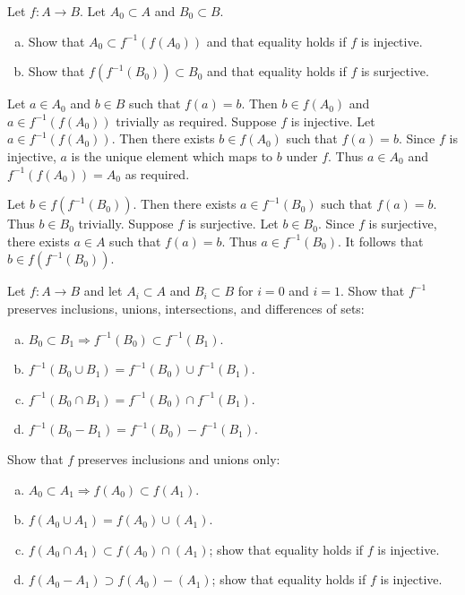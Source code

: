 \documentclass{zupan}
\begin{document}
\begin{problem}{1}
  Let $f : A \to B$. Let $A_0 \subset A$ and $B_0 \subset B$.

  \begin{enumerate}[(a), noitemsep]
    \item Show that $A_0 \subset f^{-1}(f(A_0))$ and that equality holds if $f$ is injective.
    \item Show that $f(f^{-1}(B_0)) \subset B_0$ and that equality holds if $f$ is surjective.
  \end{enumerate}
\end{problem}

\begin{solution}
  Let $a \in A_0$ and $b \in B$ such that $f(a) = b$. Then $b \in f(A_0)$ and
  $a \in f^{-1}(f(A_0))$ trivially as required. Suppose $f$ is injective. Let
  $a \in f^{-1}(f(A_0))$. Then there exists $b \in f(A_0)$ such that $f(a) =
  b$. Since $f$ is injective, $a$ is the unique element which maps to $b$ under
  $f$. Thus $a \in A_0$ and $f^{-1}(f(A_0)) = A_0$ as required.

  Let $b \in f(f^{-1}(B_0))$. Then there exists $a \in f^{-1}(B_0)$ such that
  $f(a) = b$. Thus $b \in B_0$ trivially. Suppose $f$ is surjective. Let $b \in
  B_0$. Since $f$ is surjective, there exists $a \in A$ such that $f(a) = b$.
  Thus $a \in f^{-1}(B_0)$. It follows that $b \in f(f^{-1}(B_0))$.
\end{solution}

\begin{problem}{2}
  Let $f : A \to B$ and let $A_i \subset A$ and $B_i \subset B$ for $i = 0$ and
  $i = 1$. Show that $f^{-1}$ preserves inclusions, unions, intersections, and
  differences of sets:

  \begin{enumerate}[(a), noitemsep]
    \item $B_0 \subset B_1 \Rightarrow f^{-1}(B_0) \subset f^{-1}(B_1)$.
    \item $f^{-1}(B_0 \cup B_1) = f^{-1}(B_0) \cup f^{-1}(B_1)$.
    \item $f^{-1}(B_0 \cap B_1) = f^{-1}(B_0) \cap f^{-1}(B_1)$.
    \item $f^{-1}(B_0 - B_1) = f^{-1}(B_0) - f^{-1}(B_1)$.
  \end{enumerate}

  Show that $f$ preserves inclusions and unions only:

  \begin{enumerate}[(a), noitemsep] \addtocounter{enumi}{4}
    \item $A_0 \subset A_1 \Rightarrow f(A_0) \subset f(A_1)$.
    \item $f(A_0 \cup A_1) = f(A_0) \cup (A_1)$.
    \item $f(A_0 \cap A_1) \subset f(A_0) \cap (A_1)$; show that equality holds if $f$ is injective.
    \item $f(A_0 - A_1) \supset f(A_0) - (A_1)$; show that equality holds if $f$ is injective.
  \end{enumerate}
\end{problem}
\end{document}
